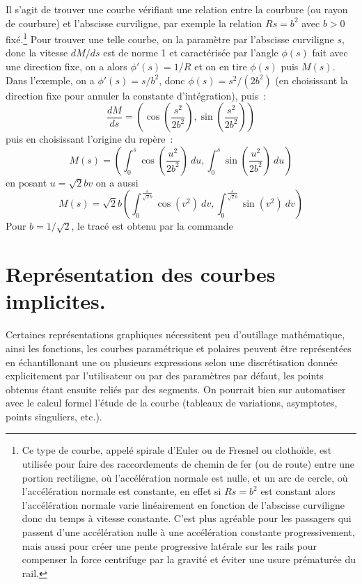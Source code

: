 \documentclass[a4paper,11pt]{book}
\begin{document}
\begin{giacjshere}
\begin{itemize}
Il s'agit de trouver une courbe v\'erifiant une relation entre la
courbure (ou rayon de courbure) et l'abscisse curviligne, par exemple
la relation $Rs=b^2$ avec $b>0$ fix\'e.\footnote{Ce type de courbe, appel\'e
spirale d'Euler ou de Fresnel ou clotho\"ide, est utilis\'ee pour
faire des raccordements de chemin de fer (ou de route) 
entre une portion rectiligne, o\`u l'acc\'el\'eration normale est
nulle, et un arc de cercle, o\`u l'acc\'el\'eration normale est
constante, en effet si $Rs=b^2$ est constant alors l'acc\'el\'eration
normale varie lin\'eairement en fonction de l'abscisse curviligne
donc du temps \`a vitesse constante. C'est plus agr\'eable pour
les passagers qui passent d'une acc\'el\'eration nulle \`a une
acc\'el\'eration constante progressivement, mais aussi pour
cr\'eer une pente progressive lat\'erale sur les rails pour compenser
la force centrifuge par la gravit\'e et \'eviter une usure
pr\'ematur\'ee du rail.}
Pour trouver une telle courbe, on la param\`etre par l'abscisse
curviligne $s$, donc la vitesse $dM/ds$ est de norme 1 et caract\'eris\'ee
par l'angle $\phi(s)$ fait avec une direction fixe, on a alors
$\phi'(s)=1/R$ et on en tire $\phi(s)$ puis $M(s)$. 
Dans l'exemple, on a $\phi'(s)=s/b^2$, donc $\phi(s)=s^2/(2b^2)$ (en
choisissant la direction fixe pour annuler la constante
d'int\'egration), puis~:
$$\frac{dM}{ds}=\left(\cos\left(\frac{s^2}{2b^2}\right),\sin\left(\frac{s^2}{2b^2}\right) \right) $$
puis en choisissant l'origine du rep\`ere~:
$$ M(s)=\left(
\int_0^s \cos\left(\frac{u^2}{2b^2}\right) \ du ,
\int_0^s \sin\left(\frac{u^2}{2b^2}\right)
\ du
\right)$$
en posant $u=\sqrt{2}b v$ on a aussi
$$ M(s)=\sqrt{2}b \left(\int_0^{\frac{s}{\sqrt{2}b}} \cos(v^2) \ dv ,
\int_0^{\frac{s}{\sqrt{2}b}} \sin(v^2) \ dv
\right)$$
Pour $b=1/\sqrt{2}$, le trac\'e est obtenu par la commande\\
\end{itemize}




\chapter{Repr\'esentation des courbes implicites.} \label{sec:implicite}
Certaines repr\'esentations graphiques n\'ecessitent peu d'outillage
math\'ematique, ainsi les fonctions, les courbes param\'etrique
et polaires peuvent \^etre repr\'esent\'ees en \'echantillonant 
une ou plusieurs expressions
selon une discr\'etisation donn\'ee explicitement par l'utilisateur
ou par des param\`etres par d\'efaut, les points obtenus
\'etant ensuite reli\'es par des segments.
On pourrait bien sur automatiser avec le calcul
formel l'\'etude de la courbe (tableaux de variations,
asymptotes, points singuliers, etc.).


\end{giacjshere}
\end{document}
